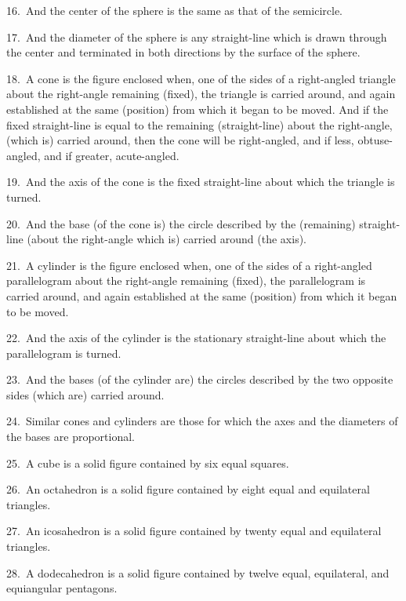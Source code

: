 \begin{Parallel}{}{}
{16.~And the center of the sphere is the same as that of the semicircle.

17.~And the diameter of the sphere is any straight-line which is
 drawn through the center and terminated in both directions by
 the surface of the sphere.
 
18.~A cone is the figure enclosed when,  one of the sides of a right-angled triangle about the right-angle remaining (fixed),
  the triangle is carried around, and again established at the
 same (position) from which it began to be moved. And if the
 fixed straight-line is equal to the remaining (straight-line) about the
 right-angle, (which is) carried around, then the cone will be right-angled, and
 if less, obtuse-angled, and if greater, acute-angled.
 
19.~And the axis of the cone is the fixed straight-line about which
 the triangle is turned.
 
20.~And the base (of the cone is) the circle described by the (remaining) straight-line (about the right-angle which is)
 carried around (the axis).
 
21.~A cylinder is the figure enclosed when, one of the sides
 of a right-angled parallelogram about the right-angle remaining (fixed),
 the parallelogram is carried around, and again established at the same
 (position) from which it began to be moved.
 
22.~And the axis of the cylinder is the stationary straight-line about which
 the parallelogram is turned.
 
23.~And the bases (of the cylinder are) the circles described by the
 two opposite sides (which are) carried around.
 
24.~Similar cones and cylinders are those for which the axes and the diameters
 of the bases are proportional.
 
25.~A cube is a solid figure contained by six equal squares.

26.~An octahedron is a solid figure contained by eight equal and
 equilateral triangles.
 
 27.~An icosahedron is a solid figure contained by twenty equal and
 equilateral triangles.
 
28.~A dodecahedron is a solid figure contained by twelve equal,
 equilateral, and equiangular pentagons.}
 \end{Parallel}
 
